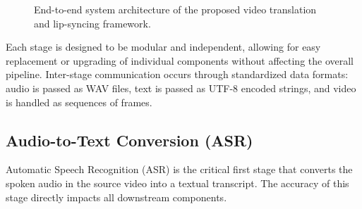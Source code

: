\documentclass[conference]{IEEEtran}
\begin{document}
\begin{figure}[htbp]
\centering
\setlength{\fboxsep}{0pt}
\caption{End-to-end system architecture of the proposed video translation and lip-syncing framework.}
\label{fig:architecture}
\end{figure}

Each stage is designed to be modular and independent, allowing for easy replacement or upgrading of individual components without affecting the overall pipeline. Inter-stage communication occurs through standardized data formats: audio is passed as WAV files, text is passed as UTF-8 encoded strings, and video is handled as sequences of frames.

\subsection{Audio-to-Text Conversion (ASR)}

Automatic Speech Recognition (ASR) is the critical first stage that converts the spoken audio in the source video into a textual transcript. The accuracy of this stage directly impacts all downstream components.
\end{document}
